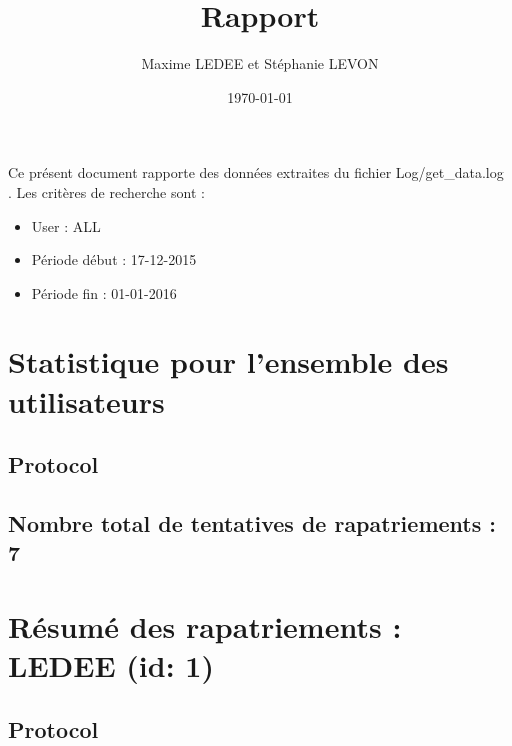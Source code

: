 \documentclass[a4paper,11pt,tikz]{article}
\title{Rapport} %
\author{Maxime LEDEE et Stéphanie LEVON} %
\date{\today} %
\begin{document}
  \maketitle

  Ce présent document rapporte des données extraites du fichier Log/get\_data.log . Les critères de recherche sont :
  \begin{itemize}
    \item User : ALL
    \item Période début : 17-12-2015
    \item Période fin : 01-01-2016
  \end{itemize}

  \tableofcontents
\newpage


\section{Statistique pour l'ensemble des utilisateurs}
  \subsection{Protocol}

  \subsection{Nombre total de tentatives de rapatriements : 7}
\newpage


\section{Résumé des rapatriements : LEDEE (id: 1)}
  \subsection{Protocol}
\end{document}
